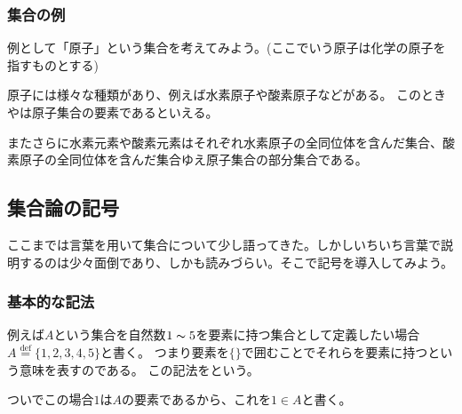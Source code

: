 \documentclass[a4j, 9pt]{ltjsarticle}
\def\define{\stackrel{\mathrm{def}}{=}}
\def\ds{\displaystyle}
\begin{document}
\begin{multicols}{2}

        \subsubsection{集合の例}
          例として「原子」という集合を考えてみよう。(ここでいう原子は化学の原子を指すものとする)\par
          原子には様々な種類があり、例えば水素原子や酸素原子などがある。
          このときやは原子集合の要素であるといえる。\par
          またさらに水素元素や酸素元素はそれぞれ水素原子の全同位体を含んだ集合、酸素原子の全同位体を含んだ集合ゆえ原子集合の部分集合である。

      \subsection{集合論の記号}
        ここまでは言葉を用いて集合について少し語ってきた。しかしいちいち言葉で説明するのは少々面倒であり、しかも読みづらい。そこで記号を導入してみよう。

        \subsubsection{基本的な記法}
          例えば$\ds A$という集合を自然数$\ds 1 \thicksim 5$を要素に持つ集合として定義したい場合$\ds A \define \{ 1, 2, 3, 4, 5 \}$と書く。
          つまり要素を$\ds \{\}$で囲むことでそれらを要素に持つという意味を表すのである。
          この記法をという。\par
          ついでこの場合$\ds 1$は$\ds A$の要素であるから、これを$\ds 1 \in A$と書く。\par
          

\end{multicols}
\end{document}
